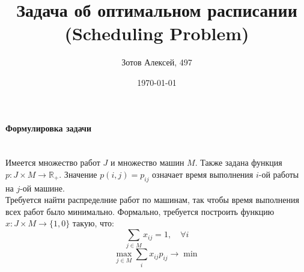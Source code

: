 \documentclass[10pt]{article}
\title{Задача об оптимальном расписании (Scheduling Problem)}
\author{Зотов Алексей, 497}
\date{\today}
\begin{document}
\maketitle
\paragraph{\Large {Формулировка задачи\\\\}} 

\indent Имеется множество работ $J$ и множество машин $M$. Также задана функция $p: J \times M \to \mathbb{R}_+$. Значение $p(i,j) = p_{ij}$ означает время выполнения $i$-ой работы на $j$-ой машине. \\
Требуется найти распределние работ по машинам, так чтобы время выполнения всех работ было минимально. Формально, требуется построить функцию $x : J \times M \to \{1,0\}$ такую, что: 
\begin{equation}
    \sum_{j \in M} x_{ij} = 1 , \quad \forall i
\end{equation}
\begin{equation}
    \max_{j \in M} \sum_{i} x_{ij} p_{ij} \to \min 
\end{equation}
\\
\\
\end{document}
